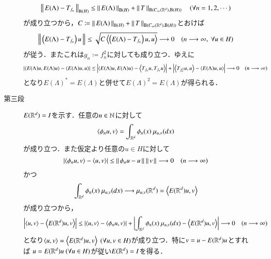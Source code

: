 \begin{prf}
\begin{description}
				\begin{align}
					\left\|\, E(\Lambda) - T_{f_n}\, \right\|_{\mathrm{B}(H) }
					\leq \left\|\, E(\Lambda)\, \right\|_{\mathrm{B}(H) } + \left\|\, T\, \right\|_{\mathrm{B}(C_\infty (\mathbb{R}^d),\mathrm{B}(H) ) }
					\quad (\forall n=1,2,\cdots)
				\end{align}
				が成り立つから，$C \coloneqq \left\|\, E(\Lambda)\, \right\|_{\mathrm{B}(H) } + \left\|\, T\, \right\|_{\mathrm{B}(C_\infty (\mathbb{R}^d),\mathrm{B}(H) ) }$とおけば
				\begin{align}
					\Norm{\left( E(\Lambda) - T_{f_n} \right)u}{}
					\leq \sqrt{C\inprod<\left( E(\Lambda) - T_{f_n} \right)u,u>}
					\longrightarrow 0 \quad (n \longrightarrow \infty,\ \forall u \in H)
				\end{align}
				が従う．またこれは$g_n \coloneqq f_n^2$に対しても成り立つ．ゆえに
				\begin{align}
					\left| \inprod<E(\Lambda)u,E(\Lambda)u> - \inprod<E(\Lambda)u,u> \right|
					\leq \left| \inprod<E(\Lambda)u,E(\Lambda)u> - \inprod<T_{f_n} u,T_{f_n} u> \right|
						+ \left| \inprod<T_{f_n^2} u,u> - \inprod<E(\Lambda)u,u> \right|
					\longrightarrow 0 \quad (n \longrightarrow \infty)
				\end{align}
				となり$E(\Lambda)^* = E(\Lambda)$と併せて$E(\Lambda)^2 = E(\Lambda)$が得られる．
				
			\item[第三段] $E(\mathbb{R}^d) = I$を示す．任意の$n \in \mathbb{N}$に対して
				\begin{align}
					\inprod<\phi_n u,v> = \int_{\R^d} \phi_n(x)\ \mu_{u,v}(dx)
				\end{align}
				が成り立つ．また仮定より任意の$u \in H$に対して
				\begin{align}
					\left| \inprod<\phi_n u,v> - \inprod<u,v> \right|
					\leq \Norm{\phi_n u - u}{} \Norm{v}{}
					\longrightarrow 0 \quad (n \longrightarrow \infty)
				\end{align}
				かつ
				\begin{align}
					\int_{\R^d} \phi_n(x)\ \mu_{u,v}(dx) \longrightarrow \mu_{u,v}(\R^d) = \inprod<E(\R^d)u,v>
				\end{align}
				が成り立つから，
				\begin{align}
					\left| \inprod<u,v> - \inprod<E(\R^d)u,v> \right|
					\leq \left| \inprod<u,v> - \inprod<\phi_n u,v> \right|
						+ \left| \int_{\R^d} \phi_n(x)\ \mu_{u,v}(dx) - \inprod<E(\R^d)u,v> \right|
					\longrightarrow 0 \quad (n \longrightarrow \infty)
				\end{align}
				となり$\inprod<u,v> = \inprod<E(\R^d)u,v>\ (\forall u,v \in H)$が成り立つ．特に$v = u - E(\mathbb{R}^d)u$とすれば
				$u = E(\R^d)u\ (\forall u \in H)$が従い$E(\mathbb{R}^d) = I$を得る．
				

\end{description}
\end{prf}
